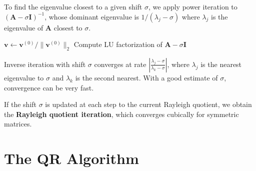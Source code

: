 \begin{definition}
\label{def:inverse-iteration}
To find the eigenvalue closest to a given shift $\sigma$, we apply power iteration to $(\mathbf{A} - \sigma\mathbf{I})^{-1}$, whose dominant eigenvalue is $1/(\lambda_j - \sigma)$ where $\lambda_j$ is the eigenvalue of $\mathbf{A}$ closest to $\sigma$.
\end{definition}

\begin{algorithm}[H]
\caption{Inverse iteration with shift}
\label{alg:inverse-iteration}
$\mathbf{v} \gets \mathbf{v}^{(0)} / \|\mathbf{v}^{(0)}\|_2$\;
Compute LU factorization of $\mathbf{A} - \sigma\mathbf{I}$\;
\;
\end{algorithm}

\begin{proposition}
Inverse iteration with shift $\sigma$ converges at rate $\left|\frac{\lambda_j - \sigma}{\lambda_k - \sigma}\right|$, where $\lambda_j$ is the nearest eigenvalue to $\sigma$ and $\lambda_k$ is the second nearest. With a good estimate of $\sigma$, convergence can be very fast.
\end{proposition}

\begin{remark}
If the shift $\sigma$ is updated at each step to the current Rayleigh quotient, we obtain the \textbf{Rayleigh quotient iteration}, which converges cubically for symmetric matrices.
\end{remark}

\section{The QR Algorithm}


